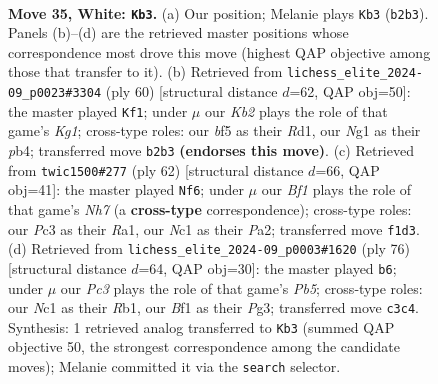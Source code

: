 \documentclass[11pt]{article}
\begin{document}
\clearpage

\begin{figure}[p]\centering
\begin{subfigure}{0.46\textwidth}\centering
\resizebox{\linewidth}{!}{%
\newchessgame
\chessboard[
  setfen={5r2/4r1k1/pp6/2p1nb2/P5p1/2P5/1K4PP/2N1RBNR w - - 0 35},
  showmover=false,
  pgfstyle=straightmove, color=movearrow, markmove={b2-b3}
]}
\caption{}
\end{subfigure}\hfill
\begin{subfigure}{0.46\textwidth}\centering
\resizebox{\linewidth}{!}{%
\newchessgame
\chessboard[
  setfen={3r1bk1/6p1/r5pp/p1n1B3/1p1N4/1P5P/1P3PP1/3RR1K1 w - - 1 31},
  showmover=false,
  pgfstyle=straightmove, color=movearrow, markmove={g1-f1}
]}
\caption{}
\end{subfigure}
\\[4pt]
\begin{subfigure}{0.46\textwidth}\centering
\resizebox{\linewidth}{!}{%
\newchessgame
\chessboard[
  setfen={2kr4/1b1n1R1N/6nb/p3p3/1p1pP2P/6NB/PPP4K/R7 w - - 1 32},
  showmover=false,
  pgfstyle=straightmove, color=movearrow, markmove={h7-f6}
]}
\caption{}
\end{subfigure}\hfill
\begin{subfigure}{0.46\textwidth}\centering
\resizebox{\linewidth}{!}{%
\newchessgame
\chessboard[
  setfen={2n1r3/2b1r3/6pk/1P1Bpp2/2Np4/3P2P1/7P/1R2R1K1 w - - 1 39},
  showmover=false,
  pgfstyle=straightmove, color=movearrow, markmove={b5-b6}
]}
\caption{}
\end{subfigure}
\caption{\textbf{Move 35, White: \texttt{Kb3}.} (a) Our position; Melanie plays \texttt{Kb3} (\texttt{b2b3}). Panels (b)--(d) are the retrieved master positions whose correspondence most drove this move (highest QAP objective among those that transfer to it). (b) Retrieved from \texttt{lichess\_elite\_2024-09\_p0023\#3304} (ply 60) [structural distance $d$=62, QAP obj=50]: the master played \texttt{Kf1}; under $\mu$ our \emph{Kb2} plays the role of that game's \emph{Kg1}; cross-type roles: our \emph{b}f5 as their \emph{R}d1, our \emph{N}g1 as their \emph{p}b4; transferred move \texttt{b2b3} \textbf{(endorses this move)}. (c) Retrieved from \texttt{twic1500\#277} (ply 62) [structural distance $d$=66, QAP obj=41]: the master played \texttt{Nf6}; under $\mu$ our \emph{Bf1} plays the role of that game's \emph{Nh7} (a \textbf{cross-type} correspondence); cross-type roles: our \emph{P}c3 as their \emph{R}a1, our \emph{N}c1 as their \emph{P}a2; transferred move \texttt{f1d3}. (d) Retrieved from \texttt{lichess\_elite\_2024-09\_p0003\#1620} (ply 76) [structural distance $d$=64, QAP obj=30]: the master played \texttt{b6}; under $\mu$ our \emph{Pc3} plays the role of that game's \emph{Pb5}; cross-type roles: our \emph{N}c1 as their \emph{R}b1, our \emph{B}f1 as their \emph{P}g3; transferred move \texttt{c3c4}. Synthesis: 1 retrieved analog transferred to \texttt{Kb3} (summed QAP objective 50, the strongest correspondence among the candidate moves); Melanie committed it via the \texttt{search} selector.}
\label{fig:thought-m68}
\end{figure}
\end{document}
